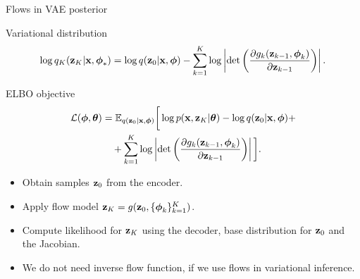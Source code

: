 \begin{frame}{Flows in VAE posterior}
\begin{block}{Variational distribution}
	\vspace{-0.6cm}
	\[
	\log q_K(\mathbf{z}_K | \mathbf{x}, \boldsymbol{\phi}_*) = \log q(\mathbf{z}_0 | \mathbf{x}, \boldsymbol{\phi}) - \sum_{k=1}^K \log \left| \det \left( \frac{\partial g_k(\mathbf{z}_{k - 1}, \boldsymbol{\phi}_k)}{\partial \mathbf{z}_{k-1}} \right) \right|.
	\]
	\vspace{-0.6cm}
\end{block}
\begin{block}{ELBO objective}
	\vspace{-0.7cm}
	\begin{align*}
		\mathcal{L} (\boldsymbol{\phi}, \boldsymbol{\theta}) 
		&= \mathbb{E}_{q(\mathbf{z}_0 | \mathbf{x}, \boldsymbol{\phi})} \bigg[\log p(\mathbf{x}, \mathbf{z}_K | \boldsymbol{\theta}) -  \log q(\mathbf{z}_0 | \mathbf{x}, \boldsymbol{\phi} ) + \\ & \quad  + \sum_{k=1}^K \log \left| \det \left( \frac{\partial g_k(\mathbf{z}_{k - 1}, \boldsymbol{\phi}_k)}{\partial \mathbf{z}_{k-1}} \right) \right| \bigg].
	\end{align*}
	\vspace{-0.5cm}
\end{block}
\begin{itemize}
	\item Obtain samples $\mathbf{z}_0$ from the encoder.
	\item Apply flow model $\mathbf{z}_K = g(\mathbf{z}_0, \{\boldsymbol{\phi}_k\}_{k = 1}^K)$.
	\item Compute likelihood for $\mathbf{z}_K$ using the decoder, base distribution for $\mathbf{z}_0$ and the Jacobian.
	\item We do not need inverse flow function, if we use flows in variational inference.
\end{itemize}
\end{frame}
